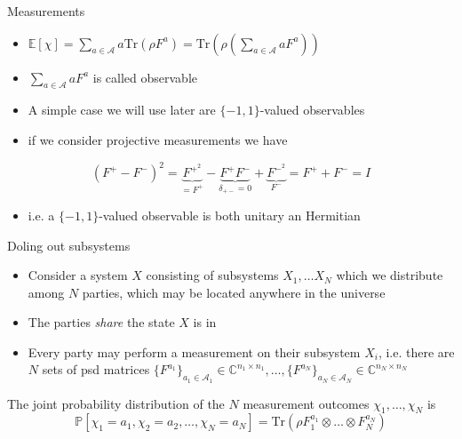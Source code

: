\begin{frame}{Measurements}
\begin{itemize}
    \item $\mathbb{E} [\chi ] = \sum_{a \in \mathcal{A}} a \text{Tr} ( \rho F^a ) =  \text{Tr} ( \rho ( \sum_{a \in \mathcal{A}} a F^a))$
    \item $\sum_{a \in \mathcal{A}} aF^a$ is called observable
    \item A simple case we will use later are $\{ -1, 1 \}$-valued observables
    \item if we consider projective measurements we have
\end{itemize}
    \begin{equation*}
(F^+-F^-)^2 = \underbrace{F^{+^2}}_{= F^+}- \underbrace{F^+F^-}_{\delta_{+-}=0} + \underbrace{F^{-^2}}_{F^-} = F^+ + F^- = I
\end{equation*}
\begin{itemize}
    \item i.e. a $\{ -1, 1 \}$-valued observable is both unitary an Hermitian 
\end{itemize}

\end{frame}

\begin{frame}{Doling out subsystems}
\begin{itemize}
    \item Consider a system $X$ consisting of subsystems $X_1, \dots X_N$ which we distribute among $N$ parties, which may be located anywhere in the universe
    \item The parties \emph{share} the state $X$ is in
    \item Every party may perform a measurement on their subsystem $X_i$, i.e. there are $N$ sets of psd matrices $\{F^{a_1} \}_{a_1 \in \mathcal{A}_1} \in \mathbb{C}^{n_1 \times n_1}, \dots , \{F^{a_N} \}_{a_N \in \mathcal{A}_N} \in \mathbb{C}^{n_N \times n_N} $
\end{itemize}
    
\end{frame}

\begin{frame}{}
    The joint probability distribution of the $N$ measurement outcomes $\chi_1 , \dots , \chi_N$ is 
\begin{equation*}
\mathbb{P}\left[ \chi_1 = a_1, \chi_2 = a_2, \dots , \chi_N = a_N \right] = \text{Tr}(\rho F_1^{a_1} \otimes \dots \otimes F_N^{a_N}) 
\end{equation*}
\end{frame}

